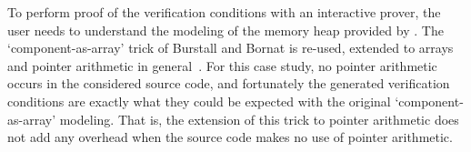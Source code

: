To perform proof of the verification conditions with an
interactive prover, the user needs to understand the
modeling of the memory heap provided by \caduceus{}. The
`component-as-array' trick of Burstall and Bornat is re-used, extended
to arrays and pointer arithmetic in
general~\cite{filliatre04icfem}. For this case study, no pointer
arithmetic occurs in the considered source code, and fortunately the
generated verification conditions are exactly what they could be
expected with the original `component-as-array' modeling. That is, the
extension of this trick to pointer arithmetic does not add any
overhead when the source code makes no use of pointer arithmetic.

